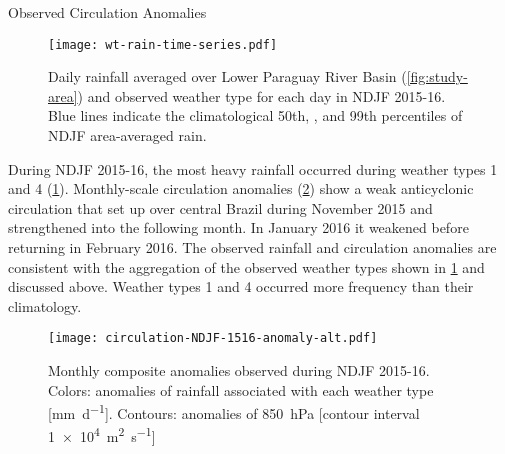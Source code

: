 \begin{block}{Observed Circulation Anomalies}
  \begin{mdframed}
  \begin{figure}
    \caption{
  		Daily rainfall averaged over Lower Paraguay River Basin (\cref{fig:study-area}) and observed weather type for each day in NDJF 2015-16.
      Blue lines indicate the climatological 50th, , and 99th percentiles of NDJF area-averaged rain.
      \label{fig:rain-wt}
  	}
  	\noindent\texttt{[image: wt-rain-time-series.pdf]}
  \end{figure}
  \end{mdframed}

  During NDJF 2015-16, the most heavy rainfall occurred during weather types 1 and 4 (\cref{fig:rain-wt}).
  Monthly-scale circulation anomalies (\cref{fig:anomalies}) show a weak anticyclonic circulation that set up over central Brazil during November 2015 and strengthened into the following month.
  In January 2016 it weakened before returning in February 2016.
  The observed rainfall and circulation anomalies are consistent with the aggregation of the observed weather types shown in \cref{fig:rain-wt} and discussed above.
  Weather types 1 and 4  occurred more frequency than their climatology.

  \begin{mdframed}
  \begin{figure}
  	\noindent\texttt{[image: circulation-NDJF-1516-anomaly-alt.pdf]}
  	\caption{
      	Monthly composite anomalies observed during NDJF 2015-16.
        Colors: anomalies of rainfall associated with each weather type [\si{\milli\meter\per\day}].
        Contours: anomalies of \SI{850}{\hecto\pascal} [contour interval \SI{1e4}{\meter\squared\per\second}]
        \label{fig:anomalies}
  	}
  \end{figure}
  \end{mdframed}
\end{block}
